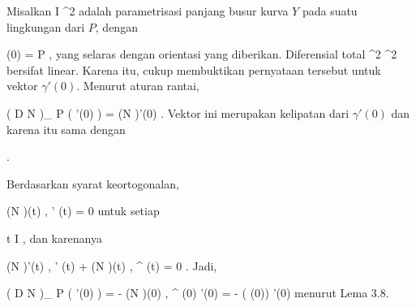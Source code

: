 {

Misalkan
\maabb {\gamma} { I } { \R^2
} {}
adalah parametrisasi panjang busur kurva $Y$ pada suatu lingkungan dari $P$, dengan

\mavergleichskette
{\vergleichskette
{ \gamma (0)
}
{ = }{ P
}
{  }{
}
{    }{
}
{   }{
}
}
{}{}{,}
yang selaras dengan orientasi yang diberikan. Diferensial total
 { \R^2} {\R^2
} {}
bersifat linear. Karena itu, cukup membuktikan pernyataan tersebut untuk vektor $\gamma'(0)$. Menurut
aturan rantai,

\mavergleichskettedisp
{\vergleichskette
{ \left(  D N   \right)_{ P } \left(   \gamma'(0)  \right)
}
{ =} { (N \circ \gamma )'(0)
}
{ } {
}
{ } {
}
{ } {
}
}
{}{}{.}
Vektor ini merupakan kelipatan dari $\gamma'(0)$ dan karena itu sama dengan

 { . }

Berdasarkan syarat keortogonalan,

\mavergleichskettedisp
{\vergleichskette
{ \left\langle  (N \circ  \gamma)(t) ,  \gamma' (t)   \right\rangle
}
{ =} { 0
}
{ } {
}
{ } {
}
{ } {
}
}
{}{}{}
untuk setiap

\mavergleichskette
{\vergleichskette
{ t
}
{ \in }{ I
}
{  }{
}
{    }{
}
{   }{
}
}
{}{}{},
dan karenanya

\mavergleichskettedisp
{\vergleichskette
{ \left\langle  (N \circ  \gamma)'(t) ,  \gamma' (t)   \right\rangle + \left\langle  (N \circ  \gamma)(t) ,  \gamma^{\prime \prime} (t)   \right\rangle
}
{ =} { 0
}
{ } {
}
{ } {
}
{ } {
}
}
{}{}{.}
Jadi,

\mavergleichskettedisp
{\vergleichskette
{ \left(  D N   \right)_{ P } \left(   \gamma'(0)  \right)
}
{ =} { - \left\langle  (N \circ  \gamma)(0) ,  \gamma^{\prime \prime} (0)   \right\rangle  \gamma'(0)
}
{ =} { - \kappa( \gamma(0)) \gamma'(0)
}
{ } {
}
{ } {
}
}
{}{}{}
menurut
Lema 3.8.

}
